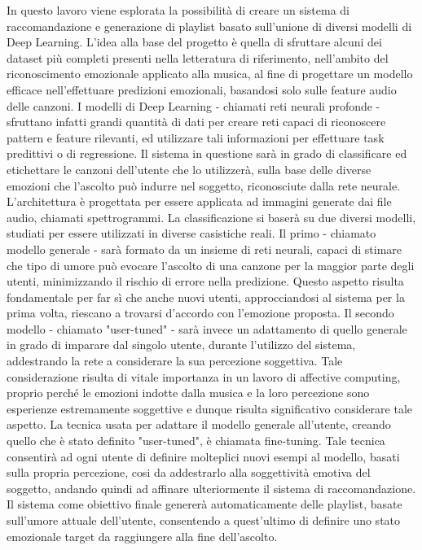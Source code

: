 \documentclass[11pt]{report}
\begin{document}
In questo lavoro viene esplorata la possibilità di creare un sistema di raccomandazione e generazione di playlist basato sull'unione di diversi modelli di Deep Learning. L'idea alla base del progetto è quella di sfruttare alcuni dei dataset più completi presenti nella letteratura di riferimento, nell'ambito del riconoscimento emozionale applicato alla musica, al fine di progettare un modello efficace nell'effettuare predizioni emozionali, basandosi solo sulle feature audio delle canzoni. I modelli di Deep Learning - chiamati reti neurali profonde - sfruttano infatti grandi quantità di dati per creare reti capaci di riconoscere pattern e feature rilevanti, ed utilizzare tali informazioni per effettuare task predittivi o di regressione.  Il sistema in questione sarà in grado di classificare ed etichettare le canzoni dell'utente che lo utilizzerà, sulla base delle diverse emozioni che l'ascolto può indurre nel soggetto, riconosciute dalla rete neurale. L'architettura è progettata per essere applicata ad immagini generate dai file audio, chiamati spettrogrammi. La classificazione si baserà su due diversi modelli, studiati per essere utilizzati in diverse casistiche reali. Il primo - chiamato modello generale - sarà formato da un insieme di reti neurali, capaci di stimare che tipo di umore può evocare l'ascolto di una canzone per la maggior parte degli utenti, minimizzando il rischio di errore nella predizione. Questo aspetto risulta fondamentale per far sì che anche nuovi utenti, approcciandosi al sistema per la prima volta, riescano a trovarsi d'accordo con l'emozione proposta. Il secondo modello - chiamato "user-tuned" - sarà invece un adattamento di quello generale in grado di imparare dal singolo utente, durante l'utilizzo del sistema, addestrando la rete a considerare la sua percezione soggettiva. Tale considerazione risulta di vitale importanza in un lavoro di affective computing, proprio perché le emozioni indotte dalla musica e la loro percezione sono esperienze estremamente soggettive e dunque risulta significativo considerare tale aspetto. La tecnica usata per adattare il modello generale all'utente, creando quello che è stato definito "user-tuned", è chiamata fine-tuning. Tale tecnica consentirà ad ogni utente di definire molteplici nuovi esempi al modello, basati sulla propria percezione, cosi da addestrarlo alla soggettività emotiva del soggetto, andando quindi ad affinare ulteriormente il sistema di raccomandazione. Il sistema come obiettivo finale genererà automaticamente delle playlist, basate sull'umore attuale dell'utente, consentendo a quest'ultimo di definire uno stato emozionale target da raggiungere alla fine dell'ascolto.\\
\end{document}
